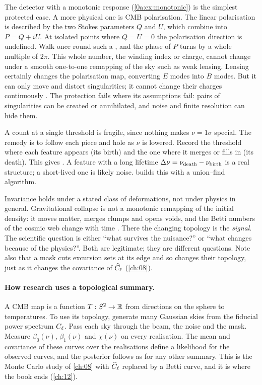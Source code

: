 The detector with a monotonic response (\cref{0a:ex:monotonic}) is the
simplest protected case. A more physical one is CMB polarisation. The linear
polarisation is described by the two Stokes parameters $Q$ and $U$, which
combine into $P=Q+iU$. At isolated points where $Q=U=0$ the polarisation
direction is undefined. Walk once round such a , and the phase of $P$ turns by a whole multiple of $2\pi$. This
whole number, the winding index or charge, cannot change under a smooth
one-to-one remapping of the sky such as weak lensing. Lensing certainly
changes the polarisation map, converting $E$ modes into $B$ modes. But it can
only move and distort singularities; it cannot change their charges
continuously \cite{VachaspatiLue2003,HutererVachaspati2005,ChallinorChon2002}.
The protection fails where its assumptions fail: pairs of singularities can be
created or annihilated, and noise and finite resolution can hide them.

A count at a single threshold is fragile, since nothing makes $\nu=1\sigma$
special. The remedy is to follow each piece and hole as $\nu$ is lowered.
Record the threshold where each feature appears (its birth) and the one where
it merges or fills in (its death). This gives . A feature
with a long lifetime $\Delta\nu=\nu_{\rm death}-\nu_{\rm birth}$ is a real
structure; a short-lived one is likely noise.  builds this with a
union--find algorithm.

\begin{pitfall}
Invariance holds under a stated class of deformations, not under physics in
general. Gravitational collapse is not a monotonic remapping of the initial
density: it moves matter, merges clumps and opens voids, and the Betti numbers
of the cosmic web change with time \cite{Wilding2021,Pranav2017}. There the
changing topology is the \emph{signal}. The scientific question is either
``what survives the nuisance?'' or ``what changes because of the physics?''.
Both are legitimate; they are different questions. Note also that a mask cuts
excursion sets at its edge and so changes their topology, just as it changes
the covariance of $\widehat{C}_\ell$ (\cref{ch:08}).
\end{pitfall}

\paragraph{How research uses a topological summary.}
A CMB map is a function $T:S^2\to\R$ from directions on the sphere to
temperatures. To use its topology, generate many Gaussian skies from the
fiducial power spectrum $C_\ell$. Pass each sky through the beam, the noise and
the mask. Measure $\beta_0(\nu)$, $\beta_1(\nu)$ and $\chi(\nu)$ on every
realisation. The mean and covariance of these curves over the realisations
define a likelihood for the observed curves, and the posterior follows as for
any other summary. This is the Monte Carlo study of \cref{ch:08} with $\widehat{C}_\ell$
replaced by a Betti curve, and it is where the book ends (\cref{ch:12}).

